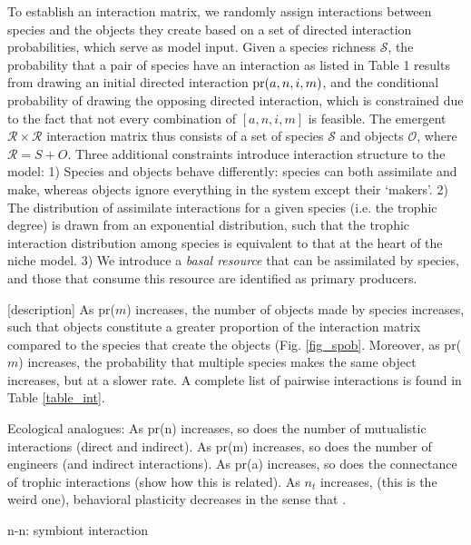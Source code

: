 \documentclass[twocolumn,preprintnumbers,amsmath,amssymb,superscriptaddress]{revtex4}
\begin{document}
To establish an interaction matrix, we randomly assign interactions between species and the objects they create based on a set of directed interaction probabilities, which serve as model input. 
Given a species richness $\mathcal S$, the probability that a pair of species have an interaction as listed in Table 1 results from drawing an initial directed interaction ${\rm pr}(a,n,i,m)$, and the conditional probability of drawing the opposing directed interaction, which is constrained due to the fact that not every combination of $[a,n,i,m]$ is feasible.
The emergent $\mathcal R \times \mathcal R$ interaction matrix thus consists of a set of species $\mathcal S$ and objects $\mathcal O$, where $\mathcal R = S + O$. 
Three additional constraints introduce interaction structure to the model:
1) Species and objects behave differently: species can both assimilate and make, whereas objects ignore everything in the system except their `makers'.
2) The distribution of assimilate interactions for a given species (i.e. the trophic degree) is drawn from an exponential distribution, such that the trophic interaction distribution among species is equivalent to that at the heart of the niche model.
3) We introduce a \emph{basal resource} that can be assimilated by species, and those that consume this resource are identified as primary producers.


[description]
As pr($m$) increases, the number of objects made by species increases, such that objects constitute a greater proportion of the interaction matrix compared to the species that create the objects (Fig. \ref{fig_spob}.
Moreover, as pr($m$) increases, the probability that multiple species makes the same object increases, but at a slower rate.
A complete list of pairwise interactions is found in Table \ref{table_int}.


Ecological analogues: 
As pr(n) increases, so does the number of mutualistic interactions (direct and indirect).
As pr(m) increases, so does the number of engineers (and indirect interactions).
As pr(a) increases, so does the connectance of trophic interactions (show how this is related).
As $n_t$ increases, (this is the weird one), behavioral plasticity decreases in the sense that .

n-n: symbiont interaction
\end{document}
